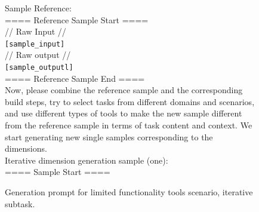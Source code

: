 \begin{figure}[!htb]
\begin{tcolorbox}[
    colback=white, 
    colframe=blue3, 
    boxrule=0.5mm,
    arc=0mm,
    outer arc=0mm,
    title=Limited Functionality Tools: Iterative - Generation Prompt
]
Sample Reference:\\
==== Reference Sample Start ====\\
// Raw Input //\\
\colorbox{blue3!50}{\texttt{[sample\_input]}}\\

// Raw output //\\
\colorbox{blue3!50}{\texttt{[sample\_outputl]}}\\
==== Reference Sample End ====\\

Now, please combine the reference sample and the corresponding build steps, try to select tasks from different domains and scenarios, and use different types of tools to make the new sample different from the reference sample in terms of task content and context. We start generating new single samples corresponding to the dimensions.\\
Iterative dimension generation sample (one):\\
==== Sample Start ====
\end{tcolorbox}
\caption{Generation prompt for limited functionality tools scenario, iterative subtask.}
\label{fig:iter-prompt}
\end{figure}